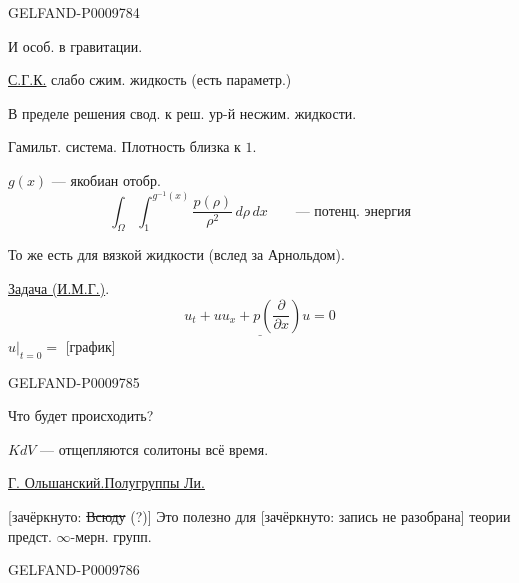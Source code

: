 \begin{GelfandAdjacentEvidence}{GELFAND-P000978}{4}


И особ. в гравитации.

\underline{С.Г.К.} слабо сжим. жидкость (есть параметр.)

В пределе решения свод. к реш. ур-й несжим. жидкости.

Гамильт. система. Плотность близка к $1$.

$g(x)$ --- якобиан отобр.
\[
 \int_\Omega\int_1^{g^{-1}(x)}\frac{p(\rho)}{\rho^2}\,d\rho\,dx
 \qquad\text{--- потенц. энергия}
\]

То же есть для вязкой жидкости (вслед за Арнольдом).

\underline{Задача (И.М.Г.)}.
\[
 \underline{u_t+uu_x+p\left(\frac{\partial}{\partial x}\right)u=0}
\]
$u|_{t=0}={}$ [график]
\end{GelfandAdjacentEvidence}
\begin{GelfandAdjacentEvidence}{GELFAND-P000978}{5}


Что будет происходить?

$KdV$ --- отщепляются солитоны всё время.

\underline{\underline{Г. Ольшанский.}}\quad\underline{Полугруппы Ли.}

[зачёркнуто: \sout{Всюду} (?)] Это полезно для
[зачёркнуто: запись не разобрана] теории предст. $\infty$-мерн. групп.
\end{GelfandAdjacentEvidence}
\begin{GelfandAdjacentEvidence}{GELFAND-P000978}{6}

\end{GelfandAdjacentEvidence}
